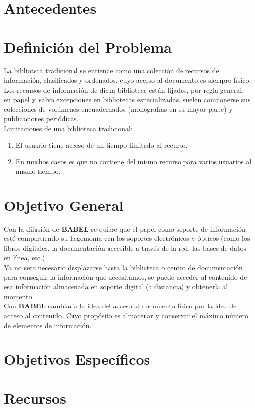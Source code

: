 \documentclass[letter,12pt]{article}
\begin{document}
\section{Antecedentes}

\section{Definición del Problema}
La biblioteca tradicional se entiende como una colección de recursos de información, clasificados y ordenados, cuyo
acceso al documento es siempre físico. Los recursos de información de dicha biblioteca están fijados, por regla general,
en papel y, salvo excepciones en bibliotecas especializadas, suelen componerse sus colecciones de volúmenes encuadernados
(monografías en su mayor parte) y publicaciones periódicas.\\
Limitaciones de una biblioteca tradicional:
\begin{enumerate}
\item El usuario tiene acceso de un tiempo limitado al recurso.
\item En muchos casos es que no contiene del mismo recurso para varios usuarios al mismo tiempo.
\end{enumerate} 

\section{Objetivo General}
Con la difusión de {\bf BABEL} se quiere que el papel como soporte de información esté compartiendo su hegemonía con los
soportes electrónicos y ópticos (como los libros digitales, la documentación accesible a través de la red, las bases de
datos en línea, etc.)\\
Ya no sera necesario desplazarse hasta la biblioteca o centro de documentación para conseguir la información que
necesitamos, se puede acceder al contenido de esa información almacenada en soporte digital (a distancia) y obtenerla al
momento.\\
Con {\bf BABEL} cambiaría la idea del acceso al documento físico por la idea de acceso al contenido. Cuyo propósito es
almacenar y conservar el máximo número de elementos de información.
\section{Objetivos Específicos}

\section{Recursos}
\end{document}
